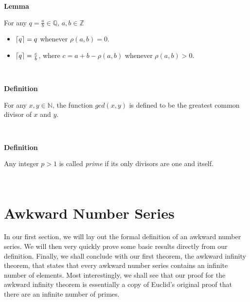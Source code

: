 \documentclass[a4paper,12pt]{article}
\DeclarePairedDelimiter{\ceil}{\lceil}{\rceil}
\begin{document}
\label{lemma:ceiling_function}
\hypertarget{lemma:ceiling_function}{}
\begin{tcolorbox}
\textbf{Lemma}

\noindent For any $q = \frac{a}{b} \in \mathbb{Q}$, $a, b \in \mathbb{Z}$

\begin{itemize}
\item $\ceil{q} = q$ whenever $\rho(a, b) = 0$.

\item  $\ceil{q} = \frac{c}{b}$, where $c = a + b - \rho(a, b)$ whenever $\rho(a, b) > 0$.
\end{itemize}


\end{tcolorbox}
\noindent \\








\label{definition:gcd}
\hypertarget{definition:gcd}{}
\begin{tcolorbox}
\textbf{Definition}

\noindent For any $x, y \in \mathbb{N}$, the function $gcd(x, y)$ is defined to be the greatest common divisor of $x$ and $y$.
\end{tcolorbox}
\noindent \\








\label{definition:prime_numbers}
\hypertarget{definition:prime_numbers}{}
\begin{tcolorbox}
\textbf{Definition}

\noindent Any integer $p > 1$ is called \textit{prime} if its only divisors are one and itself.

\end{tcolorbox}
\noindent \\









\section{Awkward Number Series}
\label{section:awkward_number_series}

\noindent In our first section, we will lay out the formal definition of an awkward number series. We will then very quickly prove some basic results directly from our definition. Finally, we shall conclude with our first theorem, the awkward infinity theorem, that states that every awkward number series contains an infinite number of elements. Most interestingly, we shall see that our proof for the awkward infinity theorem is essentially a copy of Euclid's original proof that there are an infinite number of primes.
\end{document}
